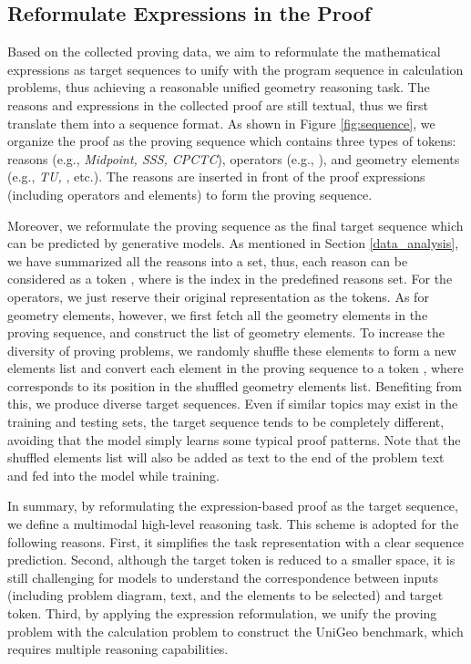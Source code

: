 \documentclass[11pt]{article}
\begin{document}
\subsection{Reformulate Expressions in the Proof}

Based on the collected proving data, we aim to reformulate the mathematical expressions as target sequences to unify with the program sequence in calculation problems, thus achieving a reasonable unified geometry reasoning task.
The reasons and expressions in the collected proof are still textual, thus we first translate them into a sequence format.
As shown in Figure \ref{fig:sequence}, we organize the proof as the proving sequence which contains three types of tokens: reasons  (e.g., \textit{Midpoint, SSS, CPCTC}), operators  (e.g., ), and geometry elements  (e.g., \textit{TU, }, etc.).
The reasons are inserted in front of the proof expressions (including operators and elements) to form the proving sequence.

Moreover, we reformulate the proving sequence as the final target sequence which can be predicted by generative models.
As mentioned in Section \ref{data_analysis}, we have summarized all the reasons into a set, thus, each reason can be considered as a token , where  is the index in the predefined reasons set. For the operators, we just reserve their original representation as the tokens.
As for geometry elements, however, we first fetch all the geometry elements in the proving sequence, and construct the list of geometry elements.
To increase the diversity of proving problems, we randomly shuffle these elements to form a new elements list and convert each element in the proving sequence to a token  , where  corresponds to its position in the shuffled geometry elements list.
Benefiting from this, we produce diverse target sequences. Even if similar topics may exist in the training and testing sets, the target sequence tends to be completely different, avoiding that the model simply learns some typical proof patterns.
Note that the shuffled elements list will also be added as text to the end of the problem text and fed into the model while training.


In summary, by reformulating the expression-based proof as the target sequence, we define a multimodal high-level reasoning task.
This scheme is adopted for the following reasons.
First, it simplifies the task representation with a clear sequence prediction. 
Second, although the target token is reduced to a smaller space, it is still challenging for models to understand the correspondence between inputs (including problem diagram, text, and the elements to be selected) and target token.
Third, by applying the expression reformulation, we unify the proving problem with the calculation problem to construct the UniGeo benchmark, which requires multiple reasoning capabilities.
\end{document}
